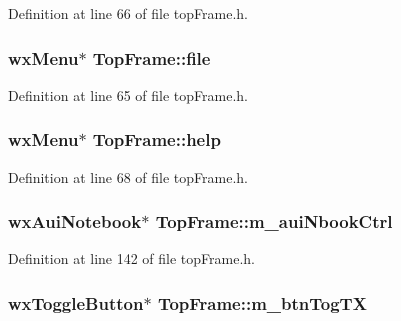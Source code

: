 Definition at line 66 of file top\-Frame.\-h.

\hypertarget{class_top_frame_a2f719fd825ff8e4dbf04bc734429b668}{
\subsubsection[{file}]{\setlength{\rightskip}{0pt plus 5cm}wx\-Menu$\ast$ Top\-Frame\-::file\hspace{0.3cm}{\ttfamily [protected]}}}\label{class_top_frame_a2f719fd825ff8e4dbf04bc734429b668}


Definition at line 65 of file top\-Frame.\-h.

\hypertarget{class_top_frame_a2f92350d1f6b62ae32ba3eef2961db5f}{
\subsubsection[{help}]{\setlength{\rightskip}{0pt plus 5cm}wx\-Menu$\ast$ Top\-Frame\-::help\hspace{0.3cm}{\ttfamily [protected]}}}\label{class_top_frame_a2f92350d1f6b62ae32ba3eef2961db5f}


Definition at line 68 of file top\-Frame.\-h.

\hypertarget{class_top_frame_af2bf3b05c2e23a16d9b74d8689c83dca}{
\subsubsection[{m\-\_\-aui\-Nbook\-Ctrl}]{\setlength{\rightskip}{0pt plus 5cm}wx\-Aui\-Notebook$\ast$ Top\-Frame\-::m\-\_\-aui\-Nbook\-Ctrl}}\label{class_top_frame_af2bf3b05c2e23a16d9b74d8689c83dca}


Definition at line 142 of file top\-Frame.\-h.

\hypertarget{class_top_frame_a1b6c8716d6993f0c28f00a5c6ada789b}{
\subsubsection[{m\-\_\-btn\-Tog\-T\-X}]{\setlength{\rightskip}{0pt plus 5cm}wx\-Toggle\-Button$\ast$ Top\-Frame\-::m\-\_\-btn\-Tog\-T\-X}}\label{class_top_frame_a1b6c8716d6993f0c28f00a5c6ada789b}


